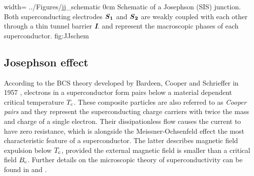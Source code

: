 {width=\textwidth}
{../Figures/jj_schematic}
{0cm}
{Schematic of a Josephson (SIS) junction. Both superconducting electrodes $\textbf{\textit{S}}_\textbf{1}$ and $\textbf{\textit{S}}_\textbf{2}$ are weakly coupled with each other through a thin tunnel barrier \textbf{\textit{I}}.  and  represent the macroscopic phases of each superconductor.} 
{fig:JJschem}

        
\subsection{Josephson effect}


According to the BCS theory developed by Bardeen, Cooper and Schrieffer in 1957 \cite{Bardeen1957}, electrons in a superconductor form pairs below a material dependent critical temperature $T_{\rm c}$. These composite particles are also referred to as \textit{Cooper pairs} and they represent the superconducting charge carriers with twice the mass and charge of a single electron. Their dissipationless flow causes the current to have zero resistance, which is alongside the Meissner-Ochsenfeld effect \cite{Meissner1933} the most characteristic feature of a superconductor. The latter describes magnetic field expulsion below $T_{\rm c}$, provided the external magnetic field is smaller than a critical field $B_{\rm c}$. Further details on the microscopic theory of superconductivity can be found in \cite{Bardeen1957} and \cite{Ginzburg1950}.

